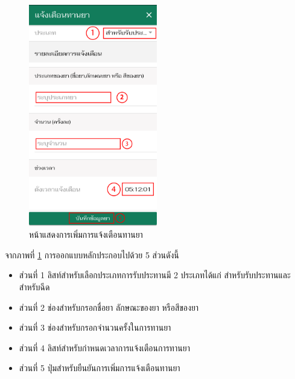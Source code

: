 		\begin{figure}[H]
			\centering
			\includegraphics[width=0.5\textwidth]{Figures/3/UI/addnotification}
			\caption{หน้าแสดงการเพิ่มการแจ้งเตือนทานยา}
			\label{Fig:เพิ่มทานยา}
		\end{figure}
		จากภาพที่ \ref{Fig:เพิ่มทานยา} การออกแบบหลักประกอบไปด้วย 5 ส่วนดังนี้
		\begin{itemize}
			\item ส่วนที่ 1 ลิสท์สำหรับเลือกประเภทการรับประทานมี 2 ประเภทได้แก่ สำหรับรับประทานและสำหรับฉีด
			\item ส่วนที่ 2 ช่องสำหรับกรอกชื่อยา ลักษณะของยา หรือสีของยา
			\item ส่วนที่ 3 ช่องสำหรับกรอกจำนวนครั้งในการทานยา
			\item ส่วนที่ 4 ลิสท์สำหรับกำหนดเวลาการแจ้งเตือนการทานยา
			\item ส่วนที่ 5 ปุ่มสำหรับยืนยันการเพิ่มการแจ้งเตือนทานยา
		\end{itemize} \\

